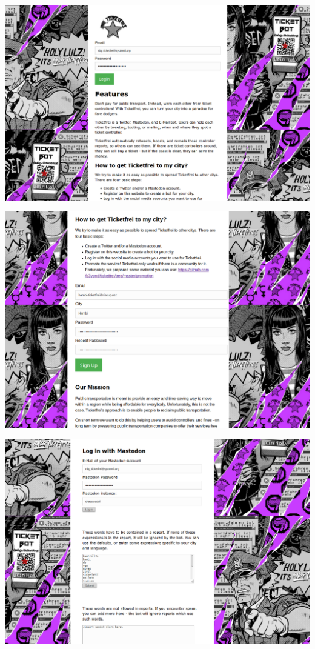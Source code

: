 \documentclass[10pt]{beamer}
\begin{document}
{\begin{frame}
	\includegraphics[width=\textwidth]{screenshots/Screenshot_2018-03-30_01-22-59.png}	
\end{frame}
\begin{frame}
	\includegraphics[width=\textwidth]{screenshots/Screenshot_2018-03-30_01-10-40.png}	
\end{frame}
\begin{frame}
	\includegraphics[width=\textwidth]{screenshots/Screenshot_2018-03-30_01-13-16.png}	
\end{frame}


}
\end{document}
